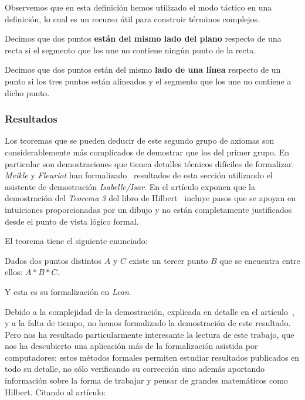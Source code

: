 Observemos que en esta definición hemos utilizado el modo táctico en una
definición, lo cual es un recurso útil para construir términos complejos.

\begin{defin*}
	Decimos que dos puntos \textbf{están del mismo lado del plano} respecto de una
	recta si el segmento que los une no contiene ningún punto de la recta.
\end{defin*}


\begin{defin*}
	Decimos que dos puntos están del mismo \textbf{lado de una línea} respecto 
        de un punto si los tres puntos están alineados y el segmento que los une no 
    contiene a dicho punto.
\end{defin*}


\subsubsection{Resultados}%

Los teoremas que se pueden deducir de este segundo grupo de axiomas son
considerablemente más complicados de demostrar que los del primer grupo. En
particular son demostraciones que tienen detalles técnicos difíciles de
formalizar. \textit{Meikle} y \textit{Fleuriot} han
formalizado~\cite{meikleFormalizingHilbertGrundlagen2003} resultados de esta
sección utilizando el asistente de demostración \textit{Isabelle/Isar}. En el
artículo exponen que la demostración del \textit{Teorema 3} del libro de
Hilbert~\cite{hilbertFoundationsGeometry} incluye pasos que se apoyan en
intuiciones proporcionadas por un dibujo y no están completamente justificados
desde el punto de vista lógico formal.

El teorema tiene el siguiente enunciado:

\setcounter{tma}{2}
\begin{tma}
	Dados dos puntos distintos $A$ y $C$ existe un tercer punto $B$ que se
	encuentra entre ellos: $A * B * C$.
\end{tma}

Y esta es su formalización en \textit{Lean}.


Debido a la complejidad de la demostración, explicada en detalle en el
artículo~\cite{meikleFormalizingHilbertGrundlagen2003}, y a la falta de tiempo,
no hemos formalizado la demostración de este resultado. Pero nos ha resultado
particularmente interesante la lectura de este trabajo, que nos ha descubierto
una aplicación más de la formalización asistida por computadores: estos métodos
formales permiten estudiar resultados publicados en todo su detalle,
no sólo verificando su corrección sino además aportando información sobre la
forma de trabajar y pensar de grandes matemáticos como Hilbert. Citando al
artículo:

